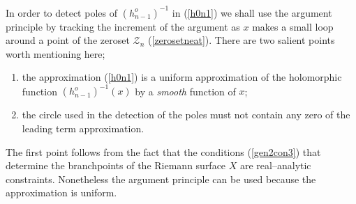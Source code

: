 \documentclass[10pt,oneside,reqno]{amsart}
\numberwithin{equation}{section}
\def\el{\end{lemma}}
\def\mod{\, \mathrm{mod}\,\,}
\def\eqref#1{(\ref{#1})}
\begin{document}
In order to detect poles of $(h^o_{n-1})^{-1}$ in \eqref{h0n1} we shall use the argument principle by tracking the increment of the argument as $x$ makes a  small loop around a point of the zeroset $\mathcal Z_n$ \eqref{zerosetneat}. There are two salient points worth mentioning here;
\begin{enumerate}
\item the approximation \eqref{h0n1} is  a uniform approximation of the holomorphic function $(h^o_{n-1})^{-1}(x)$ by a {\em smooth} function of $x$;
\item the circle used in the detection of the poles must not contain any zero of the leading term approximation.
\end{enumerate}
The first point follows from the fact that the conditions \eqref{gen2con3} that determine the branchpoints of the Riemann surface $X$ are real--analytic constraints. Nonetheless the argument principle can be used because the approximation is uniform.\smallskip
\end{document}
